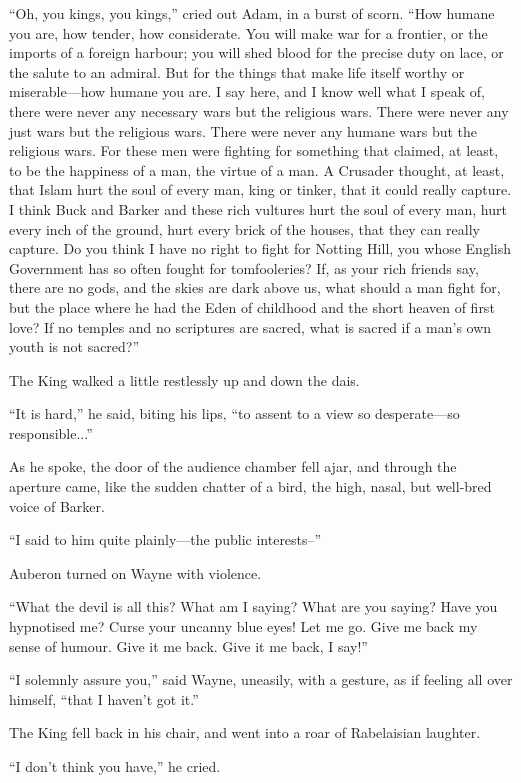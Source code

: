 \documentclass{book}
\begin{document}
“Oh, you kings, you kings,” cried out Adam, in a burst of scorn. “How humane you are, how tender, how considerate. You will make war for a frontier, or the imports of a foreign harbour; you will shed blood for the precise duty on lace, or the salute to an admiral. But for the things that make life itself worthy or miserable—how humane you are. I say here, and I know well what I speak of, there were never any necessary wars but the religious wars. There were never any just wars but the religious wars. There were never any humane wars but the religious wars. For these men were fighting for something that claimed, at least, to be the happiness of a man, the virtue of a man. A Crusader thought, at least, that Islam hurt the soul of every man, king or tinker, that it could really capture. I think Buck and Barker and these rich vultures hurt the soul of every man, hurt every inch of the ground, hurt every brick of the houses, that they can really capture. Do you think I have no right to fight for Notting Hill, you whose English Government has so often fought for tomfooleries? If, as your rich friends say, there are no gods, and the skies are dark above us, what should a man fight for, but the place where he had the Eden of childhood and the short heaven of first love? If no temples and no scriptures are sacred, what is sacred if a man’s own youth is not sacred?”

The King walked a little restlessly up and down the dais.

“It is hard,” he said, biting his lips, “to assent to a view so desperate—so responsible...”

As he spoke, the door of the audience chamber fell ajar, and through the aperture came, like the sudden chatter of a bird, the high, nasal, but well-bred voice of Barker.

“I said to him quite plainly—the public interests–”

Auberon turned on Wayne with violence.

“What the devil is all this? What am I saying? What are you saying? Have you hypnotised me? Curse your uncanny blue eyes! Let me go. Give me back my sense of humour. Give it me back. Give it me back, I say!”

“I solemnly assure you,” said Wayne, uneasily, with a gesture, as if feeling all over himself, “that I haven’t got it.”

The King fell back in his chair, and went into a roar of Rabelaisian laughter.

“I don’t think you have,” he cried.
\end{document}
